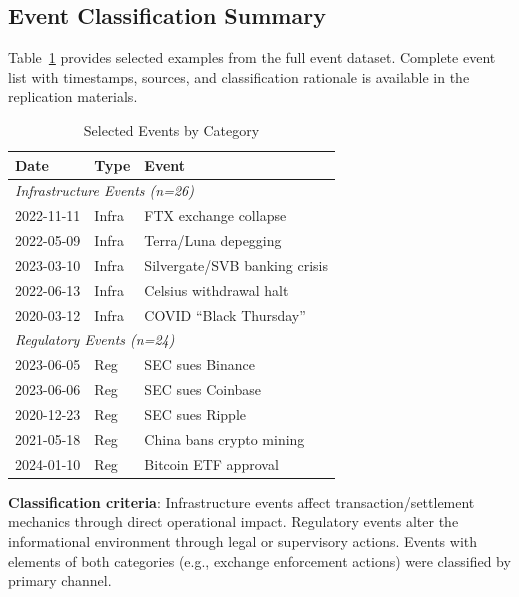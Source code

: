 \documentclass[pdflatex,sn-mathphys-num]{sn-jnl}
\theoremstyle{thmstyleone}
\theoremstyle{thmstyletwo}
\theoremstyle{thmstylethree}
\begin{document}

\begin{appendices}

\section{Event Classification Summary}\label{app:events}

Table~\ref{tab:events_summary} provides selected examples from the full event dataset. Complete event list with timestamps, sources, and classification rationale is available in the replication materials.

\begin{table}[htbp]
\centering
\caption{Selected Events by Category}\label{tab:events_summary}
\small
\begin{tabular}{@{}llp{4.5cm}@{}}
\toprule
\textbf{Date} & \textbf{Type} & \textbf{Event} \\
\midrule
\multicolumn{3}{l}{\textit{Infrastructure Events (n=26)}} \\
2022-11-11 & Infra & FTX exchange collapse \\
2022-05-09 & Infra & Terra/Luna depegging \\
2023-03-10 & Infra & Silvergate/SVB banking crisis \\
2022-06-13 & Infra & Celsius withdrawal halt \\
2020-03-12 & Infra & COVID ``Black Thursday'' \\
\midrule
\multicolumn{3}{l}{\textit{Regulatory Events (n=24)}} \\
2023-06-05 & Reg & SEC sues Binance \\
2023-06-06 & Reg & SEC sues Coinbase \\
2020-12-23 & Reg & SEC sues Ripple \\
2021-05-18 & Reg & China bans crypto mining \\
2024-01-10 & Reg & Bitcoin ETF approval \\
\bottomrule
\end{tabular}
\end{table}

\textbf{Classification criteria}: Infrastructure events affect transaction/settlement mechanics through direct operational impact. Regulatory events alter the informational environment through legal or supervisory actions. Events with elements of both categories (e.g., exchange enforcement actions) were classified by primary channel.


\end{appendices}
\end{document}
